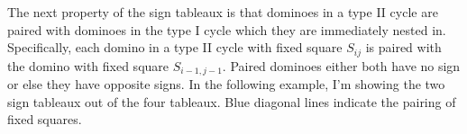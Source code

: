 \documentclass[12pt]{article}
\newcommand{\eps}{.06}
\newcommand{\teps}{\eps * 2}
\newcommand{\horizontalDomino}[3]{\filldraw [dominoStyle] (#2 - 1 + \eps, #1 - 1 + \eps) rectangle + (2 - \teps, 1 -\teps) node [dominoText] {$#3$};}
\newcommand{\verticalDomino}[3]{\filldraw [dominoStyle] (#2 - 1 + \eps,  #1 - 1 + \eps) rectangle + (1 - \teps,2 -\teps) node [dominoText] {$#3$};}
\newcommand{\horizontalDominoShift}[4]{\filldraw [dominoStyle] (#2 - 1 + #4 + \eps, #1 - 1 + \eps) rectangle + (2 - \teps, 1 -\teps) node [dominoText] {$#3$};}
\newcommand{\verticalDominoShift}[4]{\filldraw [dominoStyle] (#2 - 1 + #4 + \eps,  #1 - 1 + \eps) rectangle + (1 - \teps,2 -\teps) node [dominoText] {$#3$};}
\newcommand{\horizontalGridLine}[3]{\draw [gridLine] (#1, #2) -- + (#3,0);}
\newcommand{\verticalGridLine}[2]{\draw [gridLine] (#1, 0) -- + (0,#2);}
\newcommand{\fixedSquare}[2]{\filldraw [fixedSquareStyle] (#1,#2) rectangle +(1,1);}
\newcommand{\gridLines}[2] {
  \pgfmathsetmacro{\verticalEnd}{2 * #1}
  \pgfmathsetmacro{\horizontalEnd}{2 * #2}
  \foreach \vertical in {0,...,#2} {
    \pgfmathsetmacro{\var} {2 * \vertical}
    \verticalGridLine{\var}{\verticalEnd}
  }
  \foreach \horizontal in {0,...,#1} {
    \pgfmathsetmacro{\var} {2 * \horizontal}
    \horizontalGridLine{0}{\var}{\horizontalEnd}
  }
}
\newcommand{\gridLinesShift}[3] {
  \pgfmathsetmacro{\verticalEnd}{2 * #1}
  \pgfmathsetmacro{\horizontalEnd}{2 * #2}
  \foreach \vertical in {0,...,#2} {
    \pgfmathsetmacro{\var} {2 * \vertical + #3}
    \verticalGridLine{\var}{\verticalEnd}
  }
  \foreach \horizontal in {0,...,#1} {
    \pgfmathsetmacro{\var} {2 * \horizontal}
    \horizontalGridLine{#3}{\var}{\horizontalEnd}
  }
}
\newcommand{\fixedSquaresStart}[4]{
  \foreach \row in {#1,...,#2} {
    \foreach \column in {#3,...,#4} {
      \pgfmathsetmacro{\var}{\row + \column}
      \ifodd \var
      \else
        \fixedSquare\column\row
      \fi
    }
  }
}
\newcommand{\fixedSquares}[2]{
  \foreach \row in {0,...,#1} {
    \foreach \column in {0,...,#2} {
      \pgfmathsetmacro{\var}{\row + \column}
      \ifodd \var
        \fixedSquare\column\row
      \fi
    }
  }
}
\newcommand{\fixedSquaresForGrid}[2] {
  \pgfmathsetmacro{\rowParameter}{#1 * 2 - 1}
  \pgfmathsetmacro{\columnParameter}{#2 * 2 - 1}
  \fixedSquares{\rowParameter}{\columnParameter}
}
\newcommand{\fixedSquaresForGridShift}[3] {
  \pgfmathsetmacro{\rowParameter}{#1 * 2 - 1}
  \pgfmathsetmacro{\columnStart}{#3}
  \pgfmathsetmacro{\columnEnd}{#2 * 2 - 1 + #3}
  \fixedSquaresStart{0}{\rowParameter}{\columnStart}{\columnEnd}
}
\newcommand{\sij}{{S_{ij}}}
\renewcommand{\ss}[2]{{S_{#1,#2}}}
\begin{document}
  The next property of the sign tableaux is that dominoes in a type II cycle are paired with dominoes in the type I cycle which they are immediately nested in.
  Specifically, each domino in a type II cycle with fixed square $\sij$ is paired with the domino with fixed square $\ss{i-1}{j-1}$.
  Paired dominoes either both have no sign or else they have opposite signs.
  In the following example, I'm showing the two sign tableaux out of the four tableaux.
  Blue diagonal lines indicate the pairing of fixed squares.

  \begin{figure}[H]
    \centering
  \end{figure}
\end{document}
